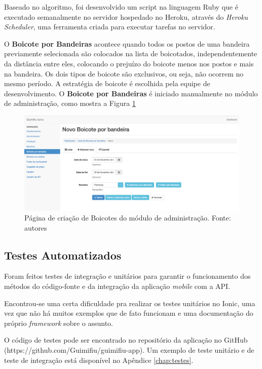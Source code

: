 Baseado no algoritmo, foi desenvolvido um script na linguagem Ruby que é executado semanalmente no servidor hospedado no Heroku, através do \textit{Heroku Scheduler}, uma ferramenta criada para executar tarefas no servidor.

O \textbf{Boicote por Bandeiras} acontece quando todos os postos de uma bandeira previamente selecionada são colocados na lista de boicotados, independentemente da distância entre eles, colocando o prejuízo do boicote menos nos postos e mais na bandeira. Os dois tipos de boicote são exclusivos, ou seja, não ocorrem no mesmo período. A estratégia de boicote é escolhida pela equipe de desenvolvimento. O \textbf{Boicote por Bandeiras} é iniciado manualmente no módulo de administração, como mostra a Figura \ref{img:admin-2}

\begin{figure}[H]
    \centering
    \includegraphics[scale=0.32]{figuras/admin-2.png}
    \caption[Página de criação de Boicotes do módulo de administração]{Página de criação de Boicotes do módulo de administração. Fonte: autores}
    \label{img:admin-2}
\end{figure}

\subsection{Testes Automatizados}

Foram feitos testes de integração e unitários para garantir o funcionamento dos métodos do código-fonte e da integração da aplicação \textit{mobile} com a API.

Encontrou-se uma certa dificuldade pra realizar os testes unitários no Ionic, uma vez que não há muitos exemplos que de fato funcionam e uma documentação do próprio \textit{framework} sobre o assunto.

O código de testes pode ser encontrado no repositório da aplicação no GitHub (https://github.com/Guimifiu/guimifiu-app). Um exemplo de teste unitário e de teste de integração está disponível no Apêndice \ref{chap:testes}.

